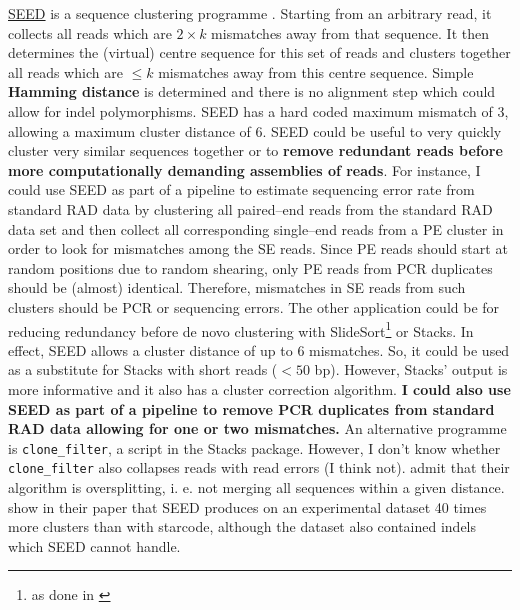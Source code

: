 \documentclass{article}\usepackage[]{graphicx}\usepackage[]{color}
\begin{document}
\href{https://github.com/baoe/SEED}{SEED} is a sequence clustering programme \citep{Bao2011}. Starting from an arbitrary read, it collects all reads which are $2 \times k$ mismatches away from that sequence. It then determines the (virtual) centre sequence for this set of reads and clusters together all reads which are $\le k$ mismatches away from this centre sequence. Simple \textbf{Hamming distance} is determined and there is no alignment step which could allow for indel polymorphisms. SEED has a hard coded maximum mismatch of 3, allowing a maximum cluster distance of 6. SEED could be useful to very quickly cluster very similar sequences together or to \textbf{remove redundant reads before more computationally demanding assemblies of reads}. For instance, I could use SEED as part of a pipeline to estimate sequencing error rate from standard RAD data by clustering all paired--end reads from the standard RAD data set and then collect all corresponding single--end reads from a PE cluster in order to look for mismatches among the SE reads. Since PE reads should start at random positions due to random shearing, only PE reads from PCR duplicates should be (almost) identical. Therefore, mismatches in SE reads from such clusters should be PCR or sequencing errors. The other application could be for reducing redundancy before de novo clustering with SlideSort\footnote{as done in \cite{Ilut2014}} or Stacks. In effect, SEED allows a cluster distance of up to 6 mismatches. So, it could be used as a substitute for Stacks with short reads ($<50$ bp). However, Stacks' output is more informative and it also has a cluster correction algorithm. \textbf{I could also use SEED as part of a pipeline to remove PCR duplicates from standard RAD data allowing for one or two mismatches.} An alternative programme is \texttt{clone\_filter}, a script in the Stacks package. However, I don't know whether \texttt{clone\_filter} also collapses reads with read errors (I think not). \cite{Bao2011} admit that their algorithm is oversplitting, i. e. not merging all sequences within a given distance. \cite{Zorita2015} show in their paper that SEED produces on an experimental dataset 40 times more clusters than with starcode, although the dataset also contained indels which SEED cannot handle.
\end{document}
